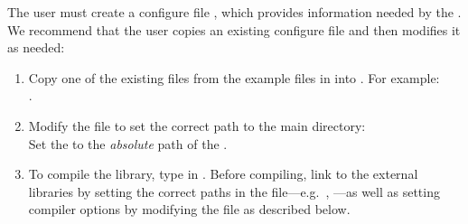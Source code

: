The user must create a configure file , which provides information needed by the . We recommend that the user copies an existing configure file and then modifies it as needed:
\begin{enumerate}
	\itemsep 0pt
	\item{
		Copy one of the existing  files from the example files in  into . For example:\\ 
		.
	} \item{
		Modify the  file to set the correct path to the main directory:\\ 
		Set the  to the \emph{absolute} path of the .
	} \item{
		To compile the library, type  in . Before compiling, link to the external libraries by setting the correct paths in the  file---e.g.~, ---as well as setting compiler options by modifying the  file as described below.
	}
\end{enumerate}

